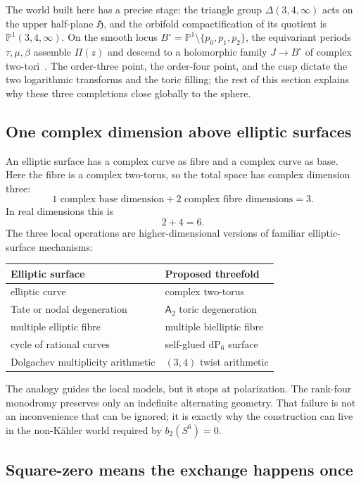 \documentclass[11pt,reqno]{amsart}
\numberwithin{equation}{section}
\newcommand{\Pone}{\mathbb P^1}
\newcommand{\dP}{\mathrm{dP}_6}
\newcommand{\Aroot}{\mathsf{A}_2}
\theoremstyle{definition}
\begin{document}
The world built here has a precise stage: the triangle group $\Delta(3,4,\infty)$ acts on the upper half-plane $\mathfrak H$, and the orbifold compactification of its quotient is $\Pone(3,4,\infty)$. On the smooth locus $B^\circ=\Pone\setminus\{p_0,p_1,p_2\}$, the equivariant periods $\tau,\mu,\beta$ assemble $\Pi(z)$ and descend to a holomorphic family $J\to B^\circ$ of complex two-tori~\cite[Prop.~2.11, Thm.~3.4]{S6}. The order-three point, the order-four point, and the cusp dictate the two logarithmic transforms and the toric filling; the rest of this section explains why these three completions close globally to the sphere.

\subsection{One complex dimension above elliptic surfaces}

An elliptic surface has a complex curve as fibre and a complex curve as base. Here the fibre is a complex two-torus, so the total space has complex dimension three:
\[
1\text{ complex base dimension}+2\text{ complex fibre dimensions}=3.
\]
In real dimensions this is
\[
2+4=6.
\]
The three local operations are higher-dimensional versions of familiar elliptic-surface mechanisms:
\begin{center}
\begin{tabular}{@{}ll@{}}
\toprule
Elliptic surface & Proposed threefold\\
\midrule
elliptic curve & complex two-torus\\
Tate or nodal degeneration & $\Aroot$ toric degeneration\\
multiple elliptic fibre & multiple bielliptic fibre\\
cycle of rational curves & self-glued $\dP$ surface\\
Dolgachev multiplicity arithmetic & $(3,4)$ twist arithmetic\\
\bottomrule
\end{tabular}
\end{center}
The analogy guides the local models, but it stops at polarization. The rank-four monodromy preserves only an indefinite alternating geometry. That failure is not an inconvenience that can be ignored; it is exactly why the construction can live in the non-K\"ahler world required by $b_2(S^6)=0$.

\subsection{Square-zero means the exchange happens once}
\end{document}
